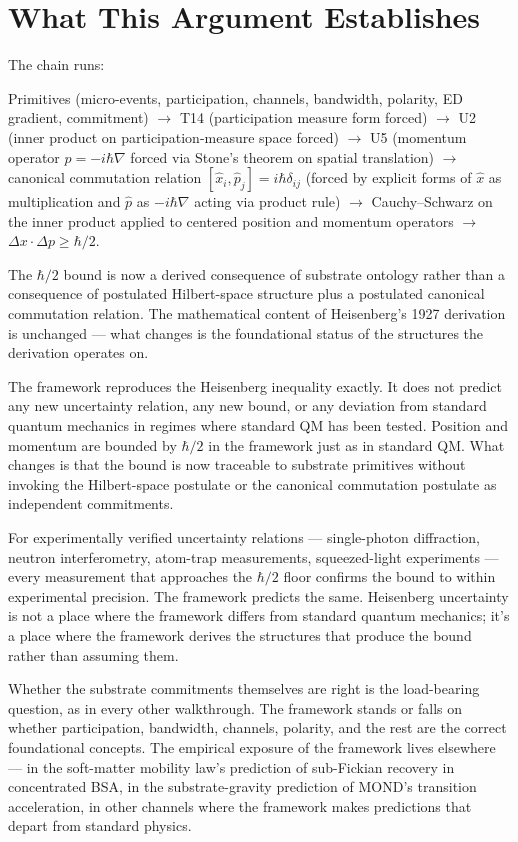 \documentclass[11pt,a4paper]{article}
\begin{document}
\section{What This Argument Establishes}

The chain runs:

Primitives (micro-events, participation, channels, bandwidth, polarity, ED gradient, commitment) $\to$ T14 (participation measure form forced) $\to$ U2 (inner product on participation-measure space forced) $\to$ U5 (momentum operator $\hat{p} = -i\hbar\nabla$ forced via Stone's theorem on spatial translation) $\to$ canonical commutation relation $[\hat{x}_i, \hat{p}_j] = i\hbar\delta_{ij}$ (forced by explicit forms of $\hat{x}$ as multiplication and $\hat{p}$ as $-i\hbar\nabla$ acting via product rule) $\to$ Cauchy--Schwarz on the inner product applied to centered position and momentum operators $\to$ $\Delta x \cdot \Delta p \geq \hbar/2$.

The $\hbar/2$ bound is now a derived consequence of substrate ontology rather than a consequence of postulated Hilbert-space structure plus a postulated canonical commutation relation. The mathematical content of Heisenberg's 1927 derivation is unchanged --- what changes is the foundational status of the structures the derivation operates on.

The framework reproduces the Heisenberg inequality exactly. It does not predict any new uncertainty relation, any new bound, or any deviation from standard quantum mechanics in regimes where standard QM has been tested. Position and momentum are bounded by $\hbar/2$ in the framework just as in standard QM. What changes is that the bound is now traceable to substrate primitives without invoking the Hilbert-space postulate or the canonical commutation postulate as independent commitments.

For experimentally verified uncertainty relations --- single-photon diffraction, neutron interferometry, atom-trap measurements, squeezed-light experiments --- every measurement that approaches the $\hbar/2$ floor confirms the bound to within experimental precision. The framework predicts the same. Heisenberg uncertainty is not a place where the framework differs from standard quantum mechanics; it's a place where the framework derives the structures that produce the bound rather than assuming them.

Whether the substrate commitments themselves are right is the load-bearing question, as in every other walkthrough. The framework stands or falls on whether participation, bandwidth, channels, polarity, and the rest are the correct foundational concepts. The empirical exposure of the framework lives elsewhere --- in the soft-matter mobility law's prediction of sub-Fickian recovery in concentrated BSA, in the substrate-gravity prediction of MOND's transition acceleration, in other channels where the framework makes predictions that depart from standard physics.
\end{document}
